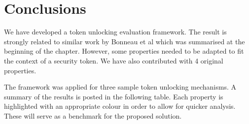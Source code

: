 	
\section{Conclusions}
We have developed a token unlocking evaluation framework. The result is strongly related to similar work by Bonneau et al \cite{bonneau2012quest} which was summarised at the beginning of the chapter. However, some properties needed to be adapted to fit the context of a security token. We have also contributed with 4 original properties. 

The framework was applied for three sample token unlocking mechanisms. A summary of the results is posted in the following table. Each property is highlighted with an appropriate colour in order to allow for quicker analysis. These will serve as a benchmark for the proposed solution. 

